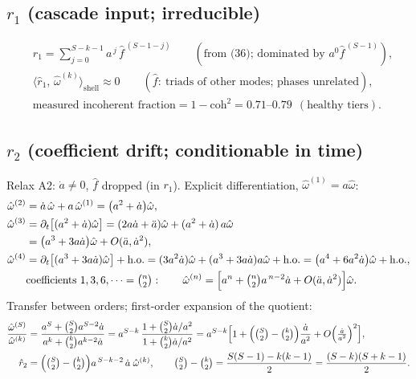 \documentclass[11pt]{article}
\begin{document}
\subsection*{$r_1$ (cascade input; irreducible)}
\begin{align}
&\hat r_1=\sum_{j=0}^{S-k-1}a^{\,j}\,\hat f^{\,(S-1-j)}
\qquad(\text{from (36); dominated by }a^{0}\hat f^{\,(S-1)}),\\
&\bigl\langle \hat r_{1},\,\hat\omega^{(k)}\bigr\rangle_{\mathrm{shell}}
\approx 0
\qquad(\hat f:\ \text{triads of other modes; phases unrelated}),\\
&\text{measured incoherent fraction}=1-\mathrm{coh}^{2}
=0.71\text{--}0.79\ \ (\text{healthy tiers}).
\end{align}

\subsection*{$r_2$ (coefficient drift; conditionable in time)}
Relax A2: $\dot a\neq0$, $\hat f$ dropped (in $r_1$).
Explicit differentiation, $\hat\omega^{(1)}=a\hat\omega$:
\begin{align}
\hat\omega^{(2)}
&=\dot a\,\hat\omega+a\,\hat\omega^{(1)}
=\bigl(a^{2}+\dot a\bigr)\hat\omega,\\
\hat\omega^{(3)}
&=\partial_t\bigl[(a^{2}+\dot a)\hat\omega\bigr]
=(2a\dot a+\ddot a)\hat\omega+(a^{2}+\dot a)\,a\hat\omega\notag\\
&=\bigl(a^{3}+3a\dot a\bigr)\hat\omega
+O(\ddot a,\dot a^{2}),\\
\hat\omega^{(4)}
&=\partial_t\bigl[(a^{3}+3a\dot a)\hat\omega\bigr]+\text{h.o.}
=(3a^{2}\dot a)\hat\omega+(a^{3}+3a\dot a)a\hat\omega+\text{h.o.}
=\bigl(a^{4}+6a^{2}\dot a\bigr)\hat\omega+\text{h.o.},\\
&\text{coefficients }1,3,6,\dots=\tbinom{n}{2}:\qquad
\hat\omega^{(n)}
=\Bigl[a^{n}+\tbinom{n}{2}a^{\,n-2}\dot a
+O(\ddot a,\dot a^{2})\Bigr]\hat\omega .
\end{align}
Transfer between orders; first-order expansion of the quotient:
\begin{align}
\frac{\hat\omega^{(S)}}{\hat\omega^{(k)}}
&=\frac{a^{S}+\binom{S}{2}a^{S-2}\dot a}
{a^{k}+\binom{k}{2}a^{k-2}\dot a}
=a^{S-k}\,
\frac{1+\binom{S}{2}\dot a/a^{2}}{1+\binom{k}{2}\dot a/a^{2}}
=a^{S-k}\Bigl[1+\Bigl(\tbinom{S}{2}-\tbinom{k}{2}\Bigr)
\frac{\dot a}{a^{2}}+O\Bigl(\tfrac{\dot a}{a^{2}}\Bigr)^{2}\Bigr],\\
\hat r_2
&=\Bigl(\tbinom{S}{2}-\tbinom{k}{2}\Bigr)
a^{\,S-k-2}\,\dot a\;\hat\omega^{(k)},\qquad
\tbinom{S}{2}-\tbinom{k}{2}
=\frac{S(S-1)-k(k-1)}{2}
=\frac{(S-k)(S+k-1)}{2}.
\end{align}
\end{document}

